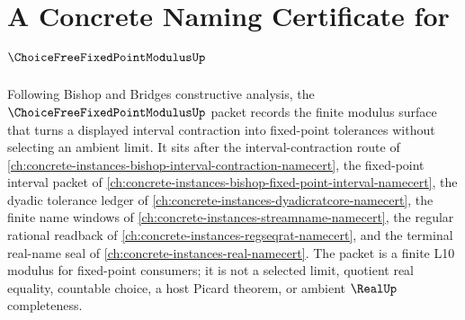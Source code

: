 \chapter{A Concrete Naming Certificate for $\ChoiceFreeFixedPointModulusUp$}
\label{ch:concrete-instances-choice-free-fixed-point-modulus-namecert}

Following Bishop and Bridges constructive analysis, the $\ChoiceFreeFixedPointModulusUp$ packet records the finite modulus surface that turns a displayed interval contraction into fixed-point tolerances without selecting an ambient limit. It sits after the interval-contraction route of \autoref{ch:concrete-instances-bishop-interval-contraction-namecert}, the fixed-point interval packet of \autoref{ch:concrete-instances-bishop-fixed-point-interval-namecert}, the dyadic tolerance ledger of \autoref{ch:concrete-instances-dyadicratcore-namecert}, the finite name windows of \autoref{ch:concrete-instances-streamname-namecert}, the regular rational readback of \autoref{ch:concrete-instances-regseqrat-namecert}, and the terminal real-name seal of \autoref{ch:concrete-instances-real-namecert}. The packet is a finite L10 modulus for fixed-point consumers; it is not a selected limit, quotient real equality, countable choice, a host Picard theorem, or ambient $\RealUp$ completeness.

